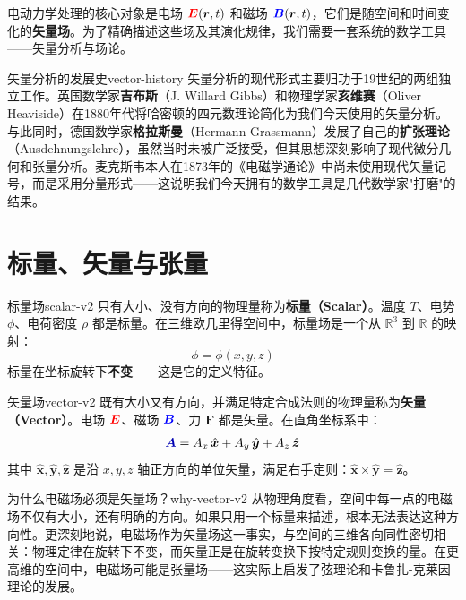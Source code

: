 \documentclass[11pt,a4paper,openany,oneside]{book}
\newcommand{\vecE}{\textcolor{red}{\vect{E}}}
\newcommand{\vecB}{\textcolor{blue}{\vect{B}}}
\newcommand{\vecA}{\textcolor{blue!70!black}{\vect{A}}}
\newcommand{\vect}[1]{\bm{#1}}
\newcommand{\unitvec}[1]{\hat{\vect{#1}}}
\begin{document}
电动力学处理的核心对象是电场 $\vecE(\vect{r},t)$ 和磁场 $\vecB(\vect{r},t)$，它们是随空间和时间变化的\textbf{矢量场}。为了精确描述这些场及其演化规律，我们需要一套系统的数学工具——矢量分析与场论。

\begin{history}{矢量分析的发展史}{vector-history}
矢量分析的现代形式主要归功于19世纪的两组独立工作。英国数学家\textbf{吉布斯}（J. Willard Gibbs）和物理学家\textbf{亥维赛}（Oliver Heaviside）在1880年代将哈密顿的四元数理论简化为我们今天使用的矢量分析。与此同时，德国数学家\textbf{格拉斯曼}（Hermann Grassmann）发展了自己的\textbf{扩张理论}（Ausdehnungslehre），虽然当时未被广泛接受，但其思想深刻影响了现代微分几何和张量分析。麦克斯韦本人在1873年的《电磁学通论》中尚未使用现代矢量记号，而是采用分量形式——这说明我们今天拥有的数学工具是几代数学家"打磨"的结果。
\end{history}

\section{标量、矢量与张量}

\begin{definition}{标量场}{scalar-v2}
只有大小、没有方向的物理量称为\textbf{标量（Scalar）}。温度 $T$、电势 $\phi$、电荷密度 $\rho$ 都是标量。在三维欧几里得空间中，标量场是一个从 $\mathbb{R}^3$ 到 $\mathbb{R}$ 的映射：
\[
\phi = \phi(x, y, z)
\]
标量在坐标旋转下\textbf{不变}——这是它的定义特征。
\end{definition}

\begin{definition}{矢量场}{vector-v2}
既有大小又有方向，并满足特定合成法则的物理量称为\textbf{矢量（Vector）}。电场 $\vecE$、磁场 $\vecB$、力 $\vect{F}$ 都是矢量。在直角坐标系中：
\[
\vecA = A_x \,\unitvec{x} + A_y \,\unitvec{y} + A_z \,\unitvec{z}
\]
其中 $\unitvec{x}, \unitvec{y}, \unitvec{z}$ 是沿 $x, y, z$ 轴正方向的单位矢量，满足右手定则：$\unitvec{x} \times \unitvec{y} = \unitvec{z}$。
\end{definition}

\begin{insight}{为什么电磁场必须是矢量场？}{why-vector-v2}
从物理角度看，空间中每一点的电磁场不仅有大小，还有明确的方向。如果只用一个标量来描述，根本无法表达这种方向性。更深刻地说，电磁场作为矢量场这一事实，与空间的三维各向同性密切相关：物理定律在旋转下不变，而矢量正是在旋转变换下按特定规则变换的量。在更高维的空间中，电磁场可能是张量场——这实际上启发了弦理论和卡鲁扎-克莱因理论的发展。
\end{insight}
\end{document}

